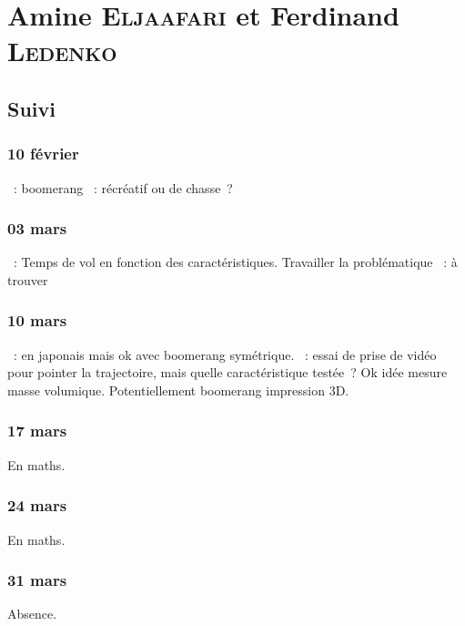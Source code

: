\documentclass[a4paper, 11pt, final, garamond]{book}
\begin{document}
\chapter{Amine \textsc{Eljaafari} et Ferdinand \textsc{Ledenko}}
\label{ch:amineferdinand}
\section{Suivi}
\subsection{10 février}
\begin{itemize}
    ~: boomerang
    ~: récréatif ou de chasse~?
\end{itemize}

\subsection{03 mars}
\begin{itemize}
    ~: Temps de vol en fonction des caractéristiques. Travailler
        la problématique
    ~: à trouver
\end{itemize}

\subsection{10 mars}
\begin{itemize}
    ~: en japonais mais ok avec boomerang symétrique.
    ~: essai de prise de vidéo pour pointer la trajectoire, mais
        quelle caractéristique testée~? Ok idée mesure masse volumique.
        Potentiellement boomerang impression 3D.
\end{itemize}

\subsection{17 mars}
\begin{center}
  En maths.
\end{center}

\subsection{24 mars}
\begin{center}
  En maths.
\end{center}

\subsection{31 mars}
\begin{center}
  Absence.
\end{center}
\end{document}
